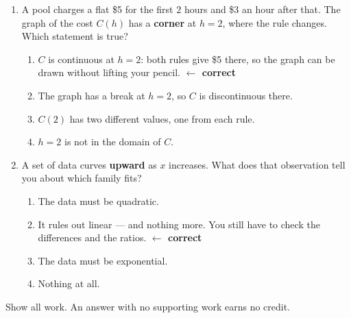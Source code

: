 \begin{enumerate}[leftmargin=1.8em, itemsep=6pt, topsep=5pt]
\item A pool charges a flat \$5 for the first $2$ hours and \$3 an hour after that. The graph of
the cost $C(h)$ has a \textbf{corner} at $h=2$, where the rule changes. Which statement is true?
\begin{enumerate}[label=(\Alph*), leftmargin=2.2em, itemsep=1pt, topsep=2pt]
  \item $C$ is continuous at $h=2$: both rules give \$5 there, so the graph can be drawn without
        lifting your pencil. \quad \textcolor{keyred}{\textbf{$\leftarrow$ correct}}
  \item The graph has a break at $h=2$, so $C$ is discontinuous there.
  \item $C(2)$ has two different values, one from each rule.
  \item $h=2$ is not in the domain of $C$.
\end{enumerate}

\item A set of data curves \textbf{upward} as $x$ increases. What does that observation tell you
about which family fits?
\begin{enumerate}[label=(\Alph*), leftmargin=2.2em, itemsep=1pt, topsep=2pt]
  \item The data must be quadratic.
  \item It rules out linear --- and nothing more. You still have to check the differences and the
        ratios. \quad \textcolor{keyred}{\textbf{$\leftarrow$ correct}}
  \item The data must be exponential.
  \item Nothing at all.
\end{enumerate}

\end{enumerate}


\noindent\small Show all work. An answer with no supporting work earns no credit.


